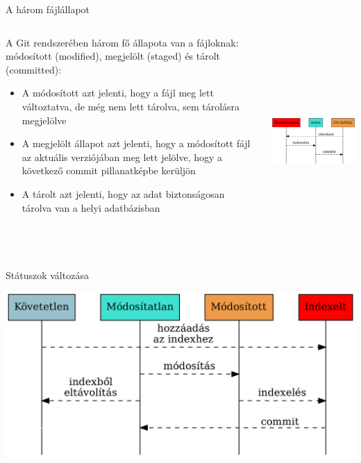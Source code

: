 \documentclass[english, aspectratio=169]{beamer}
\begin{document}
\begin{frame}{A három fájlállapot}
\begin{columns}
\begin{column}{0.5\textwidth}
A Git rendszerében három fő állapota van a fájloknak: módosított (modified), megjelölt (staged) és tárolt (committed):
\begin{itemize}
	\item A módosított azt jelenti, hogy a fájl meg lett változtatva, de még nem lett tárolva, sem tárolásra megjelölve
	\item A megjelölt állapot azt jelenti, hogy a módosított fájl az aktuális verziójában meg lett jelölve, hogy a következő commit pillanatképbe kerüljön
	\item A tárolt azt jelenti, hogy az adat biztonságosan tárolva van a helyi adatbázisban
\end{itemize}
\end{column}
\begin{column}{0.6\textwidth}
\begin{center}
\includegraphics[width=8cm, height=8cm, keepaspectratio]{graphs/git_5.png}
\end{center}
\end{column}
\end{columns}
\end{frame}

\begin{frame}{Státuszok változása}
\begin{center}
\includegraphics[width=14cm, keepaspectratio]{graphs/git_6.png}
\end{center}
\end{frame}
\end{document}
